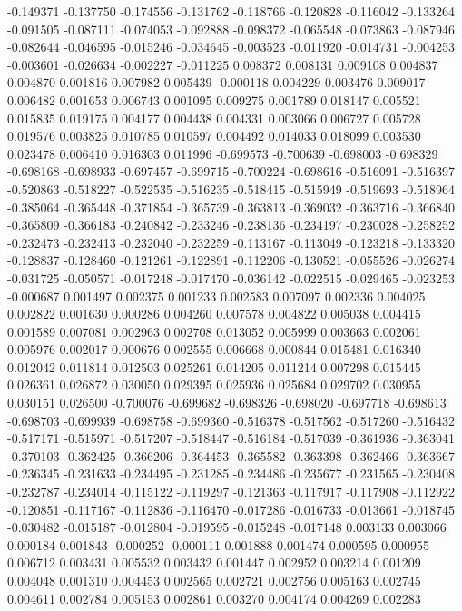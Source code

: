-0.149371
-0.137750
-0.174556
-0.131762
-0.118766
-0.120828
-0.116042
-0.133264
-0.091505
-0.087111
-0.074053
-0.092888
-0.098372
-0.065548
-0.073863
-0.087946
-0.082644
-0.046595
-0.015246
-0.034645
-0.003523
-0.011920
-0.014731
-0.004253
-0.003601
-0.026634
-0.002227
-0.011225
0.008372
0.008131
0.009108
0.004837
0.004870
0.001816
0.007982
0.005439
-0.000118
0.004229
0.003476
0.009017
0.006482
0.001653
0.006743
0.001095
0.009275
0.001789
0.018147
0.005521
0.015835
0.019175
0.004177
0.004438
0.004331
0.003066
0.006727
0.005728
0.019576
0.003825
0.010785
0.010597
0.004492
0.014033
0.018099
0.003530
0.023478
0.006410
0.016303
0.011996
-0.699573
-0.700639
-0.698003
-0.698329
-0.698168
-0.698933
-0.697457
-0.699715
-0.700224
-0.698616
-0.516091
-0.516397
-0.520863
-0.518227
-0.522535
-0.516235
-0.518415
-0.515949
-0.519693
-0.518964
-0.385064
-0.365448
-0.371854
-0.365739
-0.363813
-0.369032
-0.363716
-0.366840
-0.365809
-0.366183
-0.240842
-0.233246
-0.238136
-0.234197
-0.230028
-0.258252
-0.232473
-0.232413
-0.232040
-0.232259
-0.113167
-0.113049
-0.123218
-0.133320
-0.128837
-0.128460
-0.121261
-0.122891
-0.112206
-0.130521
-0.055526
-0.026274
-0.031725
-0.050571
-0.017248
-0.017470
-0.036142
-0.022515
-0.029465
-0.023253
-0.000687
0.001497
0.002375
0.001233
0.002583
0.007097
0.002336
0.004025
0.002822
0.001630
0.000286
0.004260
0.007578
0.004822
0.005038
0.004415
0.001589
0.007081
0.002963
0.002708
0.013052
0.005999
0.003663
0.002061
0.005976
0.002017
0.000676
0.002555
0.006668
0.000844
0.015481
0.016340
0.012042
0.011814
0.012503
0.025261
0.014205
0.011214
0.007298
0.015445
0.026361
0.026872
0.030050
0.029395
0.025936
0.025684
0.029702
0.030955
0.030151
0.026500
-0.700076
-0.699682
-0.698326
-0.698020
-0.697718
-0.698613
-0.698703
-0.699939
-0.698758
-0.699360
-0.516378
-0.517562
-0.517260
-0.516432
-0.517171
-0.515971
-0.517207
-0.518447
-0.516184
-0.517039
-0.361936
-0.363041
-0.370103
-0.362425
-0.366206
-0.364453
-0.365582
-0.363398
-0.362466
-0.363667
-0.236345
-0.231633
-0.234495
-0.231285
-0.234486
-0.235677
-0.231565
-0.230408
-0.232787
-0.234014
-0.115122
-0.119297
-0.121363
-0.117917
-0.117908
-0.112922
-0.120851
-0.117167
-0.112836
-0.116470
-0.017286
-0.016733
-0.013661
-0.018745
-0.030482
-0.015187
-0.012804
-0.019595
-0.015248
-0.017148
0.003133
0.003066
0.000184
0.001843
-0.000252
-0.000111
0.001888
0.001474
0.000595
0.000955
0.006712
0.003431
0.005532
0.003432
0.001447
0.002952
0.003214
0.001209
0.004048
0.001310
0.004453
0.002565
0.002721
0.002756
0.005163
0.002745
0.004611
0.002784
0.005153
0.002861
0.003270
0.004174
0.004269
0.002283
